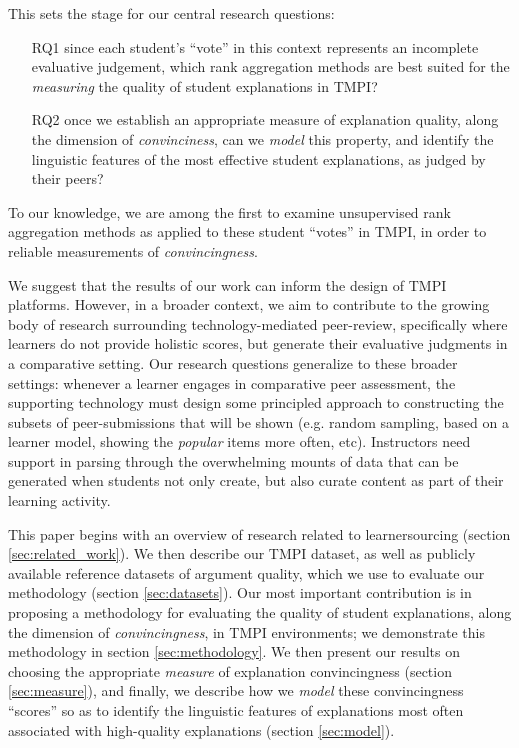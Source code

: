 \documentclass[notitlepage,12pt]{jedm}
\begin{document}
This sets the stage for our central research questions: 
\begin{itemize}
	\item[RQ1] since each student's ``vote'' in this context represents an 
	incomplete evaluative judgement, which rank aggregation 
	methods are best suited for the \textit{measuring} the quality of student 
	explanations in TMPI?
	\item[RQ2] once we establish an appropriate measure of explanation quality, 
	along the dimension of \textit{convinciness}, can we \textit{model} this 
	property, and identify the linguistic features of the 
	most effective student explanations, as judged by their peers?
\end{itemize}

To our knowledge, we are among the first to examine unsupervised rank 
aggregation methods as applied to these student ``votes'' in TMPI, in order to 
reliable measurements of \textit{convincingness}. 

We suggest that the results of our work can inform the design of TMPI platforms.
However, in a broader context, we aim to contribute to the growing body of 
research surrounding technology-mediated peer-review, specifically where 
learners do not provide holistic scores, but generate their evaluative 
judgments in a comparative setting.
Our research questions generalize to these broader settings: whenever a 
learner engages in comparative peer assessment, the supporting technology must 
design some principled approach to constructing the subsets of peer-submissions 
that will be shown (e.g. random sampling, based on a learner model, showing the 
\textit{popular} items more often, etc).
Instructors need support in parsing through the overwhelming mounts of data 
that can be generated when students not only create, but also curate content as 
part of their learning activity. 

This paper begins with an overview of research related to learnersourcing  
(section \ref{sec:related_work}).
We then describe our TMPI dataset, as well as publicly available reference 
datasets of argument quality, which we use to evaluate our methodology (section 
\ref{sec:datasets}).
Our most important contribution is in proposing a methodology for evaluating 
the quality of student explanations, along the dimension of 
\textit{convincingness}, in TMPI environments; we demonstrate this methodology 
in section \ref{sec:methodology}.
We then present our results on choosing the appropriate \textit{measure} of 
explanation convincingness (section \ref{sec:measure}), and finally, we 
describe how we \textit{model} these convincingness ``scores'' so as to 
identify the linguistic features of explanations most often associated with 
high-quality explanations (section \ref{sec:model}).
\end{document}
